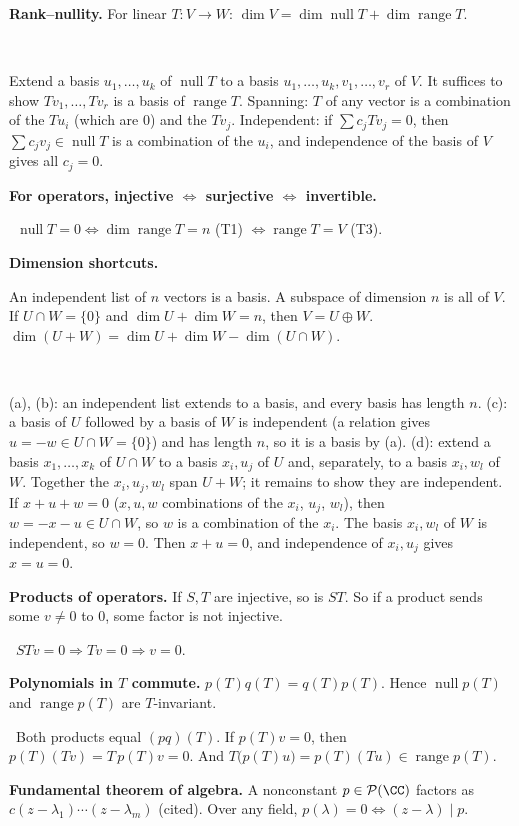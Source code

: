 \documentclass[10pt]{scrartcl}
\DeclareMathOperator{\nul}{null}
\DeclareMathOperator{\range}{range}
\newcommand{\PP}{\mathcal P}
\newcommand{\tool}[1]{\textbf{#1}}
\newcommand{\why}[1]{\par\vspace{2pt}{\color{OliveGreen!70!black}\textbf{Why.}}\ #1\par}
\newenvironment{steps}{\begin{enumerate}[label=\arabic*.,leftmargin=1.5em,itemsep=2pt,topsep=2pt]}{\end{enumerate}}
\begin{document}
\begin{enumerate}[label=(T\arabic*),leftmargin=2.6em,itemsep=8pt]
  \ii \tool{Rank--nullity.} For linear $T\colon V\to W$: $\dim V=\dim\nul T+\dim\range T$.
  \why{\begin{steps}
    \ii Extend a basis $u_1,\dots,u_k$ of $\nul T$ to a basis $u_1,\dots,u_k,v_1,\dots,v_r$ of $V$. It suffices to show $Tv_1,\dots,Tv_r$ is a basis of $\range T$.
    \ii Spanning: $T$ of any vector is a combination of the $Tu_i$ (which are $0$) and the $Tv_j$.
    \ii Independent: if $\sum c_jTv_j=0$, then $\sum c_jv_j\in\nul T$ is a combination of the $u_i$, and independence of the basis of $V$ gives all $c_j=0$.
  \end{steps}}
  \ii \tool{For operators, injective $\iff$ surjective $\iff$ invertible.}
  \why{$\nul T=0\iff\dim\range T=n$ (T1) $\iff\range T=V$ (T3).}
  \ii \tool{Dimension shortcuts.}
  \begin{enumerate}[(a)]
    \ii An independent list of $n$ vectors is a basis.
    \ii A subspace of dimension $n$ is all of $V$.
    \ii If $U\cap W=\{0\}$ and $\dim U+\dim W=n$, then $V=U\oplus W$.
    \ii $\dim(U+W)=\dim U+\dim W-\dim(U\cap W)$.
  \end{enumerate}
  \why{\begin{steps}
    \ii (a), (b): an independent list extends to a basis, and every basis has length $n$.
    \ii (c): a basis of $U$ followed by a basis of $W$ is independent (a relation gives $u=-w\in U\cap W=\{0\}$) and has length $n$, so it is a basis by (a).
    \ii (d): extend a basis $x_1,\dots,x_k$ of $U\cap W$ to a basis $x_i,u_j$ of $U$ and, separately, to a basis $x_i,w_l$ of $W$. Together the $x_i,u_j,w_l$ span $U+W$; it remains to show they are independent.
    \ii If $x+u+w=0$ ($x,u,w$ combinations of the $x_i$, $u_j$, $w_l$), then $w=-x-u\in U\cap W$, so $w$ is a combination of the $x_i$. The basis $x_i,w_l$ of $W$ is independent, so $w=0$. Then $x+u=0$, and independence of $x_i,u_j$ gives $x=u=0$.
  \end{steps}}
  \ii \tool{Products of operators.} If $S,T$ are injective, so is $ST$. So if a product sends some $v\ne0$ to $0$, some factor is not injective.
  \why{$STv=0\Rightarrow Tv=0\Rightarrow v=0$.}
  \ii \tool{Polynomials in $T$ commute.} $p(T)q(T)=q(T)p(T)$. Hence $\nul p(T)$ and $\range p(T)$ are $T$-invariant.
  \why{Both products equal $(pq)(T)$. If $p(T)v=0$, then $p(T)(Tv)=T\,p(T)v=0$. And $T\bigl(p(T)u\bigr)=p(T)(Tu)\in\range p(T)$.}
  \ii \tool{Fundamental theorem of algebra.} A nonconstant $p\in\PP(\CC)$ factors as $c(z-\lambda_1)\cdots(z-\lambda_m)$ (cited). Over any field, $p(\lambda)=0\iff(z-\lambda)\mid p$.

\end{enumerate}
\end{document}
